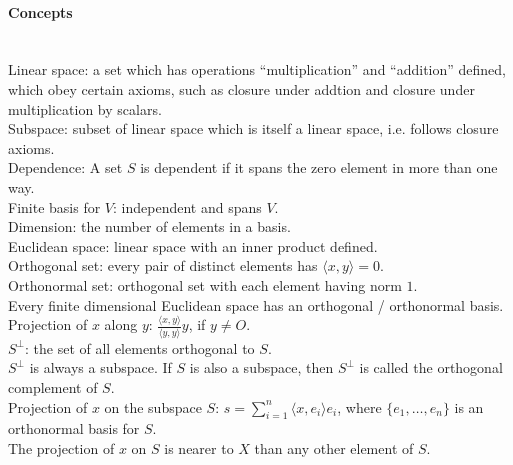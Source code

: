 \documentclass[10pt]{article}
\begin{document}
\paragraph{Concepts}\ \\
Linear space: a set which has operations ``multiplication'' and ``addition'' defined, which obey certain
axioms, such as closure under addtion and closure under multiplication by scalars.\\
Subspace: subset of linear space which is itself a linear space, i.e. follows closure axioms.\\
Dependence: A set $S$ is dependent if it spans the zero element in more than one way.\\
Finite basis for $V$: independent and spans $V$.\\
Dimension: the number of elements in a basis.\\
Euclidean space: linear space with an inner product defined.\\
Orthogonal set: every pair of distinct elements has $\langle x,y \rangle = 0$.\\
Orthonormal set: orthogonal set with each element having norm $1$.\\
Every finite dimensional Euclidean space has an orthogonal / orthonormal basis.\\
Projection of $x$ along $y$: $\frac{\langle x, y \rangle}{\langle y, y \rangle} y$, if $y \neq O$.\\
$S^\bot$: the set of all elements orthogonal to $S$.\\ 
$S^\bot$ is always a subspace. If $S$ is also a subspace, then $S^\bot$ is called the orthogonal complement of $S$.\\
Projection of $x$ on the subspace $S$: $s = \sum_{i=1}^n \langle x, e_i \rangle e_i$, where $\{e_1, \dotsc, e_n\}$
is an orthonormal basis for $S$.\\
The projection of $x$ on $S$ is nearer to $X$ than any other element of $S$.
\end{document}
